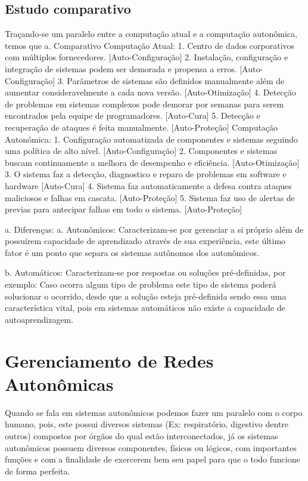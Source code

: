 \documentclass[11pt,twoside]{article}
\begin{document}
\subsection{Estudo comparativo}
Traçando-se um paralelo entre a computação atual e a computação autonômica, temos que
a.	Comparativo
Computação Atual:
1.	Centro de dados corporativos com múltiplos fornecedores. [Auto-Configuração]
2.	Instalação, configuração e integração de sistemas podem ser demorada e propensa a erros. [Auto-Configuração]
3.	Parâmetros de sistemas são definidos manualmente além de aumentar consideravelmente a cada nova versão. [Auto-Otimização]
4.	Detecção de problemas em sistemas complexos pode demorar por semanas para serem encontrados pela equipe de programadores. [Auto-Cura]
5.	Detecção e recuperação de ataques é feita manualmente. [Auto-Proteção]
Computação Autonômica:
1.	Configuração automatizada de componentes e sistemas seguindo uma política de alto nível. [Auto-Configuração]
2.	Componentes e sistemas buscam continuamente a melhora de desempenho e eficiência. [Auto-Otimização]
3.	O sistema faz a detecção, diagnostico e reparo de problemas em software e hardware [Auto-Cura]
4.	Sistema faz automaticamente a defesa contra ataques maliciosos e falhas em cascata. [Auto-Proteção]
5.	Sistema faz uso de alertas de previas para antecipar falhas em todo o sistema. [Auto-Proteção]

a.	Diferenças:
a.	Autonômicos: Caracterizam-se por gerenciar a si próprio além de possuírem capacidade de aprendizado através de sua experiência, este último fator é um ponto que separa os sistemas autônomos dos autonômicos.

b.	Automáticos: Caracterizam-se por respostas ou soluções pré-definidas, por exemplo: Caso ocorra algum tipo de problema este tipo de sistema poderá solucionar o ocorrido, desde que a solução esteja pré-definida sendo essa uma característica vital, pois em sistemas automáticos não existe a capacidade de autoaprendizagem.


\section{Gerenciamento de Redes Autonômicas}
Quando se fala em sistemas autonômicos podemos fazer um paralelo com o corpo humano, pois, este possui diversos sistemas (Ex: respiratório, digestivo dentre outros) compostos por órgãos do qual estão interconectados, já os sistemas autonômicos possuem diversos componentes, físicos ou lógicos, com importantes funções e com a finalidade de exercerem bem seu papel para que o todo funcione de forma perfeita.
\end{document}
